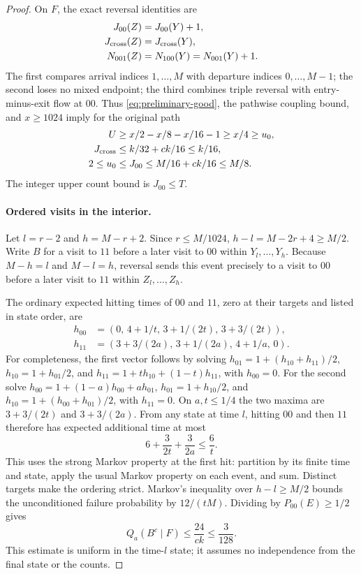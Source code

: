 \begin{proof}
On $F$, the exact reversal identities are
\begin{equation}
 \begin{split}
 J_{00}(Z)&=J_{00}(Y)+1,\\
 J_{\rm cross}(Z)&=J_{\rm cross}(Y),\\
 N_{001}(Z)&=N_{100}(Y)=N_{001}(Y)+1.
 \end{split}\label{eq:reverse-count-shifts}
\end{equation}
The first compares arrival indices $1,\ldots,M$ with departure indices
$0,\ldots,M-1$; the second loses no mixed endpoint; the third combines
triple reversal with entry-minus-exit flow at $00$.
Thus \eqref{eq:preliminary-good}, the pathwise coupling bound, and
$x\ge1024$ imply for the original path
\begin{align*}
 U&\ge x/2-x/8-x/16-1\ge x/4\ge u_0,\\
 J_{\rm cross}&\le k/32+ck/16\le k/16,\\
 2\le u_0&\le J_{00}\le M/16+ck/16\le M/8.
\end{align*}
The integer upper count bound is $J_{00}\le T$.

\paragraph{Ordered visits in the interior.}
Let $l=r-2$ and $h=M-r+2$. Since $r\le M/1024$,
$h-l=M-2r+4\ge M/2$. Write $B$ for a visit to $11$ before a later
visit to $00$ within $Y_l,\ldots,Y_h$. Because $M-h=l$ and $M-l=h$,
reversal sends this event precisely to a visit to $00$ before a later
visit to $11$ within $Z_l,\ldots,Z_h$.

The ordinary expected hitting times of $00$ and $11$, zero at their
targets and listed in state order, are
\begin{align*}
 h_{00}&=(0,\,4+1/t,\,3+1/(2t),\,3+3/(2t)),\\
 h_{11}&=(3+3/(2a),\,3+1/(2a),\,4+1/a,\,0).
\end{align*}
For completeness, the first vector follows by solving
$h_{01}=1+(h_{10}+h_{11})/2$,
$h_{10}=1+h_{01}/2$, and
$h_{11}=1+th_{10}+(1-t)h_{11}$, with $h_{00}=0$.
For the second solve
$h_{00}=1+(1-a)h_{00}+ah_{01}$,
$h_{01}=1+h_{10}/2$, and
$h_{10}=1+(h_{00}+h_{01})/2$, with $h_{11}=0$.
On $a,t\le1/4$ the two maxima are
$3+3/(2t)$ and $3+3/(2a)$. From any state at time $l$, hitting $00$
and then $11$ therefore has expected additional time at most
\[
 6+\frac{3}{2t}+\frac{3}{2a}\le\frac6t.
\]
This uses the strong Markov property at the first hit: partition by its
finite time and state, apply the usual Markov property on each event,
and sum. Distinct targets make the ordering strict. Markov's inequality
over $h-l\ge M/2$ bounds the unconditioned failure probability by
$12/(tM)$. Dividing by $P_{00}(E)\ge1/2$ gives
\[
 Q_a(B^c\mid F)\le\frac{24}{ck}\le\frac3{128}.
\]
This estimate is uniform in the time-$l$ state; it assumes no
independence from the final state or the counts.


\end{proof}

